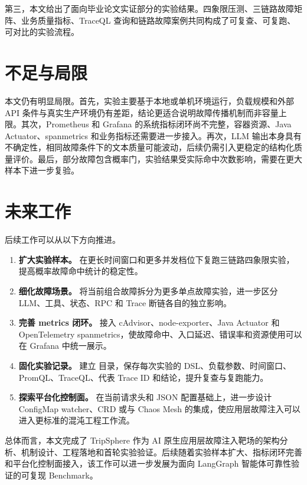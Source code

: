 第三，本文给出了面向毕业论文实证部分的实验结果。四象限压测、三链路故障矩阵、业务质量指标、TraceQL 查询和链路故障案例共同构成了可复查、可复跑、可对比的实验流程。

\section{不足与局限}

本文仍有明显局限。首先，实验主要基于本地或单机环境运行，负载规模和外部 API 条件与真实生产环境仍有差距，结论更适合说明故障传播机制而非容量上限。其次，Prometheus 和 Grafana 的系统指标闭环尚不完整，容器资源、Java Actuator、spanmetrics 和业务指标还需要进一步接入。再次，LLM 输出本身具有不确定性，相同故障条件下的文本质量可能波动，后续仍需引入更稳定的结构化质量评价。最后，部分故障包含概率门，实验结果受实际命中次数影响，需要在更大样本下进一步复验。

\section{未来工作}

后续工作可以从以下方向推进。

\begin{enumerate}[label=(\arabic*)]
  \item \textbf{扩大实验样本。} 在更长时间窗口和更多并发档位下复跑三链路四象限实验，提高概率故障命中统计的稳定性。
  \item \textbf{细化故障场景。} 将当前组合故障拆分为更多单点故障实验，进一步区分 LLM、工具、状态、RPC 和 Trace 断链各自的独立影响。
  \item \textbf{完善 metrics 闭环。} 接入 cAdvisor、node-exporter、Java Actuator 和 OpenTelemetry spanmetrics，使故障命中、入口延迟、错误率和资源使用可以在 Grafana 中统一展示。
  \item \textbf{固化实验记录。} 建立  目录，保存每次实验的 DSL、负载参数、时间窗口、PromQL、TraceQL、代表 Trace ID 和结论，提升复查与复跑能力。
  \item \textbf{探索平台化控制面。} 在当前请求头和 JSON 配置基础上，进一步设计 ConfigMap watcher、CRD 或与 Chaos Mesh 的集成，使应用层故障注入可以进入更标准的混沌工程工作流。
\end{enumerate}

总体而言，本文完成了 TripSphere 作为 AI 原生应用层故障注入靶场的架构分析、机制设计、工程落地和首轮实验验证。后续随着实验样本扩大、指标闭环完善和平台化控制面接入，该工作可以进一步发展为面向 LangGraph 智能体可靠性验证的可复现 Benchmark。
